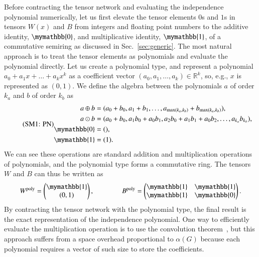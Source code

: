 \documentclass[onefignum, onetabnum]{siamart190516}
\newcommand{\eqname}[1]{\stepcounter{equation}\tag{\theequation : #1}}
\newcommand{\<}{\langle}
\renewcommand{\>}{\rangle}
\begin{document}
Before contracting the tensor network and evaluating the independence polynomial numerically, let us first elevate the tensor elements $0$s and $1$s in tensors $W(x)$ and $B$ from integers and floating point numbers to the additive identity,
$\mymathbb{0}$, and multiplicative identity, $\mymathbb{1}$, of a commutative semiring as discussed in Sec.~\ref{sec:generic}.
The most natural approach is to treat the tensor elements as polynomials and evaluate the polynomial directly.
Let us create a polynomial type, and represent a polynomial $a_0 + a_1 x + \ldots + a_k x^k$ as a coefficient vector $(a_0, a_1, \ldots, a_k) \in \mathbb{R}^k$, so, e.g., $x$ is represented as $(0, 1)$.
We define the algebra between the polynomials $a$ of order $k_a$ and $b$ of order $k_b$ as
\begin{equation}
    \eqname{PN}
    \begin{split}
    a \oplus b &= (a_0 + b_0, a_1 + b_1, \ldots, a_{\max(k_a, k_b)} + b_{\max(k_a, k_b)}),\\
    a \odot b &= (a_0 + b_0, a_1b_0 + a_0b_1, a_{2}b_{0} + a_{1}b_{1} + a_{0}b_{2},  \ldots, a_{k_a} b_{k_b}),\\
    \mymathbb{0} &= (),  \\
    \mymathbb{1} &= (1).\label{eq:polynomial}
    \end{split}
\end{equation}
We can see these operations are standard addition and multiplication operations of polynomials, and the polynomial type forms a commutative ring. The tensors $W$ and $B$ can thus be written as 
\begin{equation}
    W^{\rm poly} = \left(\begin{matrix}
        \mymathbb{1} \\
        (0,1)
    \end{matrix}\right),   
    \qquad \qquad
        B^{\rm poly} = \left(\begin{matrix}
        \mymathbb{1}  & \mymathbb{1} \\
        \mymathbb{1} & \mymathbb{0}
    \end{matrix}\right).
\end{equation}
By contracting the tensor network with the polynomial type, the final result is the exact representation of the independence polynomial.
One way to efficiently evaluate the multiplication operation is to use the convolution theorem~\cite{Schonhage1971}, but this approach suffers from a space overhead proportional to $\alpha(G)$ because each polynomial requires a vector of such size to store the coefficients. 
\end{document}
